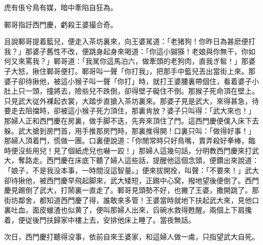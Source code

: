 \begin{myquote}
虎有倀兮鳥有媒，暗中牽陷自狂為。

鄆哥指訏西門慶，虧殺王婆撮合奇。
\end{myquote}

且說鄆哥提着籃兒，便走入茶坊裏來，向王婆駡道：「老猪狗！你昨日為甚麽便打我？」那婆子舊性不改，便跳身起身來喝道：「你這小猢猻！老娘與你無干，你如何又來罵我？」鄆哥道：「我駡你這馬泊六，做牽頭的老狗肉，直我ぎ䯲！」那婆子大怒，揪住鄆哥便打。鄆哥叫一聲「你打我」，把那手中籃兒丟出當街上來。那婆子卻待揪他，被這小猴子叫一聲「你打」時，就打王婆腰裏帶個住，看着婆子小肚上只一頭，撞將去，險些兒不跌倒，卻得壁子礙住不倒。那猴子死命頂在壁上。只見武大従外裸起衣裳，大踏步直搶入茶坊裏來。那婆子見是武大，來得甚急，待要走去阻擋時，卻被這小猴子死力頂住，那裏肯放？婆子只叫得：「武大來也！」那婦人正和西門慶在房裏，做手脚不迭，先奔來頂住了門。這西門慶便僕入床下去躲。武大搶到房門首，用手推那房門時，那裏推得開！口裏只叫：「做得好事！」那婦人頂着門，慌做一團。口裏便說道：「你閒常時只好鳥嘴，賣弄殺好拳棒，臨時便沒些用兒！見了個紙虎兒也嚇一跤！」那婦人這幾句話，分明教西門慶來打武大，奪路走。西門慶在床底下聽了婦人這些話，提醒他這個念頭，便鑽出來說道：「娘子，不是我没本事，一時間沒這智量。」便來拔開拴，叫聲：「不要來！」武大卻待揪他，被西門慶早飛起脚來，武大矮短，正踢中心窝，撥地望後便倒了。西門慶見踢倒了武大，打鬧裏一直走了。鄆哥見頭勢不好，也撇了王婆，撒開跳了。那街坊鄰舍，都知道西門慶了得，誰敢來多管！王婆當時就地下扶起武大來，見他口裏吐血，面皮蠟渣也似黄了，便叫那婦人出來，舀碗水救得甦醒。兩個上下肩攙着，便従後門扶歸家中樓上去，安排他床上睡了。當夜無話。

次日，西門慶打聽得没事，依前自來王婆家，和這婦人做一䖏，只指望武大自死。

